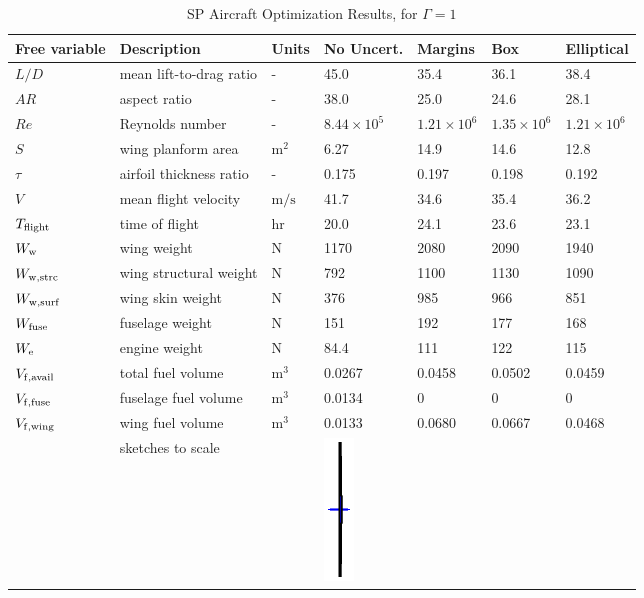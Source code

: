 \begin{table}[!h]
\begin{center}
\caption{\label{tab:results} SP Aircraft Optimization Results, for $\Gamma = 1$}
\begin{tabular}{C{2cm} C{3.8cm} C{1.25cm} C{1.6cm} C{1.6cm} C{1.6cm} C{1.6cm}}
\hline
Free variable & Description & Units & No Uncert. & Margins & Box & Elliptical \\
\hline
$L/D$ & mean lift-to-drag ratio & - & 45.0 & 35.4 & 36.1 & 38.4 \\
$AR$ & aspect ratio & - & 38.0 & 25.0 & 24.6 & 28.1 \\
$Re$ & Reynolds number & - & $8.44 \times 10^5$ & $1.21 \times 10^6$ & $1.35\times 10^6$ & $1.21 \times 10^6$ \\
$S$ & wing planform area &$\mathrm{m^2}$ & 6.27 & 14.9 & 14.6 & 12.8 \\
$\tau$ & airfoil thickness ratio & - & 0.175 & 0.197 & 0.198 & 0.192 \\
$V$ & mean flight velocity &$\mathrm{m/s}$ & 41.7 & 34.6 & 35.4 & 36.2 \\
$T_{\rm{flight}}$ & time of flight & $\mathrm{hr}$ & 20.0 & 24.1 & 23.6 & 23.1 \\
$W_{\rm{w}}$ & wing weight & $\mathrm{N}$ & 1170 & 2080 & 2090 & 1940 \\
$W_{\rm{w,strc}}$ & wing structural weight &$\mathrm{N}$ & 792 & 1100 & 1130 & 1090 \\
$W_{\rm{w,surf}}$ & wing skin weight &$\mathrm{N}$ & 376 & 985 & 966 & 851 \\
$W_{\rm{fuse}}$ & fuselage weight &$\mathrm{N}$ & 151 & 192 & 177 & 168 \\
$W_{\rm{e}}$ & engine weight &$\mathrm{N}$ & 84.4 & 111 & 122 & 115 \\
$V_{\rm{f,avail}}$ & total fuel volume & $\mathrm{m^3}$ & 0.0267 & 0.0458 & 0.0502 & 0.0459 \\
$V_{\rm{f,fuse}}$ & fuselage fuel volume & $\mathrm{m^3}$ & 0.0134 & 0 & 0 & 0 \\
$V_{\rm{f,wing}}$ & wing fuel volume &$\mathrm{m^3}$ & 0.0133 & 0.0680 & 0.0667 & 0.0468    \\
& sketches to scale & &
    \includegraphics[trim={10.5cm 1.5cm 10.5cm 1.5cm},clip,height=3.8cm]{nominal.eps} &

\end{tabular}
\end{center}
\end{table}
